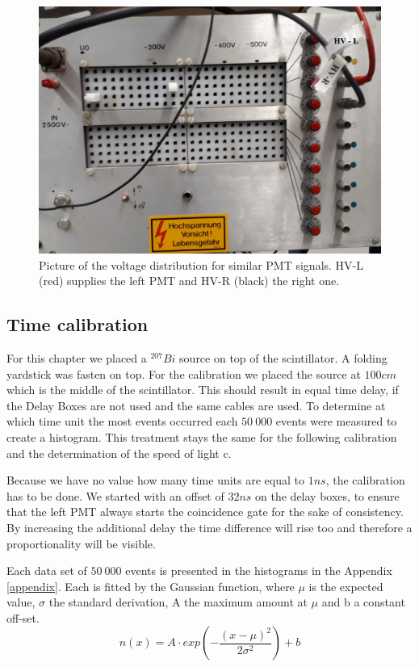 \documentclass[]{article}
\begin{document}
\begin{figure}[H]
\centering
\includegraphics[width=1\textwidth]{Plots/Spannung.jpg}
\caption{Picture of the voltage distribution for similar PMT signals. HV-L (red) supplies the left PMT and HV-R (black) the right one.}
\label{fig:voltage}
\end{figure}


\subsection{Time calibration}\label{time}
For this chapter we placed a $^{207}Bi$ source on top of the scintillator. A folding yardstick was fasten on top. For the calibration we placed the source at $100cm$ which is the middle of the scintillator. This should result in equal time delay, if the Delay Boxes are not used and the same cables are used. To determine at which time unit the most events occurred each $50\ 000$ events were measured to create a histogram. This treatment stays the same for the following calibration and the determination of the speed of light c.

Because we have no value how many time units are equal to $1ns$, the calibration has to be done. We started with an offset of $32ns$ on the delay boxes, to ensure that the left PMT always starts the coincidence gate for the sake of consistency. By increasing the additional delay the time difference will rise too and therefore a proportionality will be visible.

Each data set of $50\ 000$ events is presented in the histograms in the Appendix \ref{appendix}. Each is fitted by the Gaussian function, where $\mu$ is the expected value, $\sigma$ the standard derivation, A the maximum amount at $\mu$ and b a constant off-set. 
\begin{equation}
n(x) = A\cdot exp \left( -\frac{(x-\mu)^2}{2\sigma^2} \right) + b
\end{equation}
\end{document}
